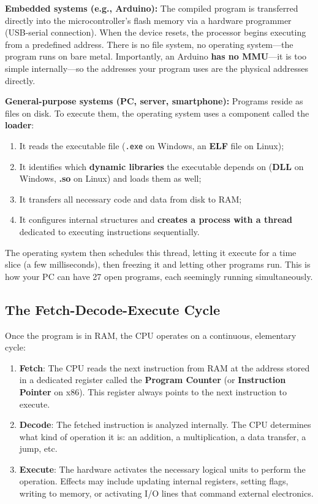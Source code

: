 \textbf{Embedded systems (e.g., Arduino):} The compiled program is transferred directly into the microcontroller's flash memory via a hardware programmer (USB-serial connection). When the device resets, the processor begins executing from a predefined address. There is no file system, no operating system---the program runs on bare metal. Importantly, an Arduino \textbf{has no MMU}---it is too simple internally---so the addresses your program uses are the physical addresses directly.

\textbf{General-purpose systems (PC, server, smartphone):} Programs reside as files on disk. To execute them, the operating system uses a component called the \textbf{loader}:
\begin{enumerate}
    \item It reads the executable file (\texttt{.exe} on Windows, an \textbf{ELF} file on Linux);
    \item It identifies which \textbf{dynamic libraries} the executable depends on (\textbf{DLL} on Windows, \textbf{.so} on Linux) and loads them as well;
    \item It transfers all necessary code and data from disk to RAM;
    \item It configures internal structures and \textbf{creates a process with a thread} dedicated to executing instructions sequentially.
\end{enumerate}

The operating system then schedules this thread, letting it execute for a time slice (a few milliseconds), then freezing it and letting other programs run. This is how your PC can have 27 open programs, each seemingly running simultaneously.

\subsection{The Fetch-Decode-Execute Cycle}

Once the program is in RAM, the CPU operates on a continuous, elementary cycle:

\begin{enumerate}
    \item \textbf{Fetch}: The CPU reads the next instruction from RAM at the address stored in a dedicated register called the \textbf{Program Counter} (or \textbf{Instruction Pointer} on x86). This register always points to the next instruction to execute.
    \item \textbf{Decode}: The fetched instruction is analyzed internally. The CPU determines what kind of operation it is: an addition, a multiplication, a data transfer, a jump, etc.
    \item \textbf{Execute}: The hardware activates the necessary logical units to perform the operation. Effects may include updating internal registers, setting flags, writing to memory, or activating I/O lines that command external electronics.
\end{enumerate}

